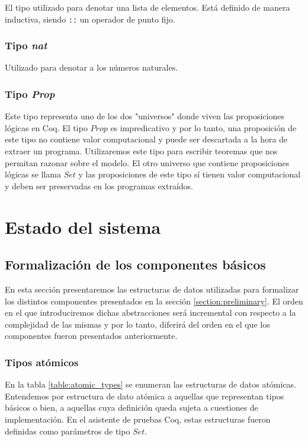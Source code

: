 El tipo utilizado para denotar una lista de elementos. Está definido de manera inductiva, siendo
\texttt{::} un operador de punto fijo.

\subsubsection*{Tipo \textit{nat}}
Utilizado para denotar a los números naturales.

\subsubsection*{Tipo \textit{Prop}}

Este tipo representa uno de los dos "universos" donde viven las proposiciones lógicas en Coq. El tipo
$Prop$ es impredicativo y por lo tanto, una proposición de este tipo no contiene valor
computacional\cite{proof-irrelevance} y puede ser descartada a la hora de extraer un programa.
Utilizaremos este tipo para escribir teoremas que nos permitan razonar sobre el modelo. El otro
universo que contiene proposiciones lógicas se llama $Set$ y las proposiciones de este tipo sí tienen
valor computacional y deben ser preservadas en los programas extraídos.


\section{Estado del sistema}
\label{section:formalization:state}

\subsection{Formalización de los componentes básicos}
En esta sección presentaremos las estructuras de datos utilizadas para formalizar los distintos
componentes presentados en la sección \ref{section:preliminary}. El orden en el que introduciremos
dichas abstracciones será incremental con respecto a la complejidad de las mismas y por lo tanto,
diferirá del orden en el que los componentes fueron presentados anteriormente.

\subsubsection*{Tipos atómicos}
En la tabla \ref{table:atomic_types} se enumeran las estructuras de datos atómicas. Entendemos por
estructura de dato atómica a aquellas que representan tipos básicos o bien, a aquellas cuya definición
queda sujeta a cuestiones de implementación. En el asistente de pruebas Coq, estas estructuras fueron
definidas como parámetros de tipo $Set$.

